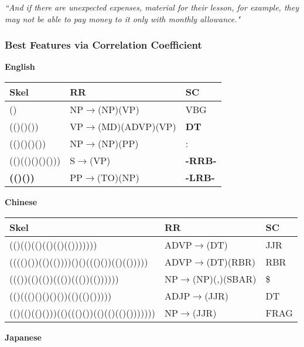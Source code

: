 \begin{frame}
    {\normalsize
    \emph{``And if there are unexpected expenses, material for their lesson, for
    example, they may not be able to pay money to it only with monthly
    allowance."}}
\end{frame}

\begin{frame}
    \frametitle{Best Features via Correlation Coefficient}
    {\tiny
    \begin{center}
    \textbf{English}

    \begin{tabular}{|l|l|l|}
        \hline
        \textbf{Skel} & \textbf{RR }& \textbf{SC }\\
        \hline
        ()             &  NP$\rightarrow$(NP)(VP)      &  VBG  \\
        (()()())       &  VP$\rightarrow$(MD)(ADVP)(VP)&  \textbf{DT}   \\
        (()()()())     &  NP$\rightarrow$(NP)(PP)      &  :    \\
        (()(()()()())) &  S$\rightarrow$(VP)           &  \textbf{-RRB-}\\
        \textbf{(()())}         &  PP$\rightarrow$(TO)(NP)      &  \textbf{-LRB-}\\
        \hline
    \end{tabular}

    \vspace{.1in}
    \textbf{Chinese}

    \begin{tabular}{|l|l|l|}
        \hline
        \textbf{Skel} & \textbf{RR }& \textbf{SC }\\
        \hline
        (()(()(()(()(()(())))))) & ADVP$\rightarrow$(DT)       &  JJR \\
         (((()())(()(())))()()((()())(()(())))) & ADVP$\rightarrow$(DT)(RBR)  &  RBR \\
        ((())(()(())((())((())(())))))  & NP$\rightarrow$(NP)(,)(SBAR)& \$   \\
        (()((()()()()())(()(()())))) &  ADJP$\rightarrow$(JJR)      &  DT  \\
        (()(()(()()))(()((()())(()(()(()()))))))   & NP$\rightarrow$(JJR)        &  FRAG\\
        \hline
    \end{tabular}

    \vspace{.1in}
    \textbf{Japanese}


\end{center}}
\end{frame}
